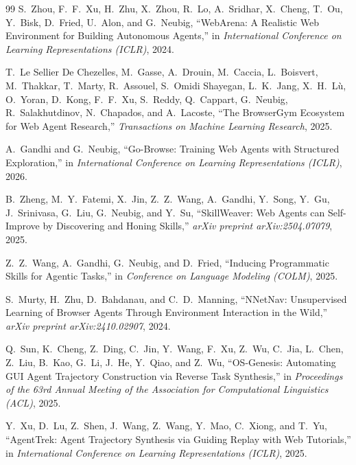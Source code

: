 \documentclass[14pt]{article}
\begin{document}
\renewcommand{\refname}{}
\vspace{-2em}
\begin{thebibliography}{99}
S.~Zhou, F.~F.~Xu, H.~Zhu, X.~Zhou, R.~Lo, A.~Sridhar, X.~Cheng, T.~Ou, Y.~Bisk, D.~Fried, U.~Alon, and G.~Neubig,
``{WebArena}: A Realistic Web Environment for Building Autonomous Agents,''
in \textit{International Conference on Learning Representations (ICLR)},
2024.

T.~Le Sellier De Chezelles, M.~Gasse, A.~Drouin, M.~Caccia, L.~Boisvert, M.~Thakkar, T.~Marty, R.~Assouel, S.~Omidi Shayegan, L.~K.~Jang, X.~H.~L\`u, O.~Yoran, D.~Kong, F.~F.~Xu, S.~Reddy, Q.~Cappart, G.~Neubig, R.~Salakhutdinov, N.~Chapados, and A.~Lacoste,
``The {BrowserGym} Ecosystem for Web Agent Research,''
\textit{Transactions on Machine Learning Research},
2025.

A.~Gandhi and G.~Neubig,
``{Go-Browse}: Training Web Agents with Structured Exploration,''
in \textit{International Conference on Learning Representations (ICLR)},
2026.

B.~Zheng, M.~Y.~Fatemi, X.~Jin, Z.~Z.~Wang, A.~Gandhi, Y.~Song, Y.~Gu, J.~Srinivasa, G.~Liu, G.~Neubig, and Y.~Su,
``{SkillWeaver}: Web Agents can Self-Improve by Discovering and Honing Skills,''
\textit{arXiv preprint arXiv:2504.07079},
2025.

Z.~Z.~Wang, A.~Gandhi, G.~Neubig, and D.~Fried,
``Inducing Programmatic Skills for Agentic Tasks,''
in \textit{Conference on Language Modeling (COLM)},
2025.

S.~Murty, H.~Zhu, D.~Bahdanau, and C.~D.~Manning,
``{NNetNav}: Unsupervised Learning of Browser Agents Through Environment Interaction in the Wild,''
\textit{arXiv preprint arXiv:2410.02907},
2024.

Q.~Sun, K.~Cheng, Z.~Ding, C.~Jin, Y.~Wang, F.~Xu, Z.~Wu, C.~Jia, L.~Chen, Z.~Liu, B.~Kao, G.~Li, J.~He, Y.~Qiao, and Z.~Wu,
``{OS-Genesis}: Automating {GUI} Agent Trajectory Construction via Reverse Task Synthesis,''
in \textit{Proceedings of the 63rd Annual Meeting of the Association for Computational Linguistics (ACL)},
2025.

Y.~Xu, D.~Lu, Z.~Shen, J.~Wang, Z.~Wang, Y.~Mao, C.~Xiong, and T.~Yu,
``{AgentTrek}: Agent Trajectory Synthesis via Guiding Replay with Web Tutorials,''
in \textit{International Conference on Learning Representations (ICLR)},
2025.


\end{thebibliography}
\end{document}
